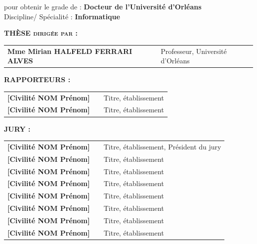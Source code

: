 {\begin{sffamily}
\vspace{0.3cm}
	
\begin{minipage}{\textwidth}
\centering\large
pour obtenir le grade de : \textbf{Docteur de l'Université d'Orléans \\ \vspace{0.3cm}}
Discipline/ Spécialité : \textbf{Informatique}
\end{minipage}
	
\vspace{0.3cm}


\vspace{0.3cm}
\large
\textsc{\textbf{THÈSE dirigée par : }}\vspace*{2mm}\\ 
\begin{tabular}{l p{2cm} p{8cm}}
\textbf{Mme Mirian HALFELD FERRARI ALVES} & $\ $ & Professeur, Université d’Orléans\\
\end{tabular}

\vspace{0.3cm}

\textsc{\textbf{RAPPORTEURS :}}\vspace*{2mm}\\
\begin{tabular}{l p{2cm} p{8cm}}
\textbf{[Civilité NOM Prénom]} &  &  Titre, établissement\\
\textbf{[Civilité NOM Prénom]} &  &  Titre, établissement\\
\end{tabular}

\hrulefill

\vspace{0.3cm}

\textsc{\textbf{JURY : }}\vspace*{2mm}\\
\begin{tabular}{l p{2cm} p{8cm}}
\textbf{[Civilité NOM Prénom]} &  & Titre, établissement, Président du jury\\
\textbf{[Civilité NOM Prénom]} &  & Titre, établissement\\
\textbf{[Civilité NOM Prénom]} &  & Titre, établissement\\
\textbf{[Civilité NOM Prénom]} &  & Titre, établissement\\
\textbf{[Civilité NOM Prénom]} &  & Titre, établissement\\
\textbf{[Civilité NOM Prénom]} &  & Titre, établissement\\
\textbf{[Civilité NOM Prénom]} &  & Titre, établissement\\
\textbf{[Civilité NOM Prénom]} &  & Titre, établissement\\
\end{tabular}


\end{sffamily}}
